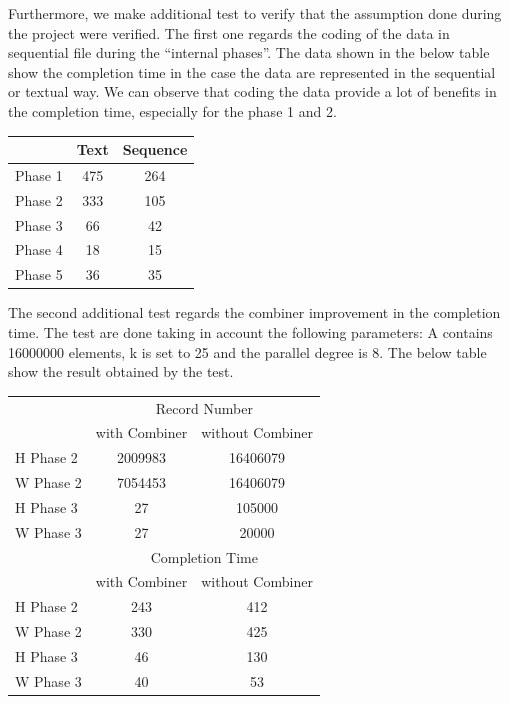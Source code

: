 Furthermore, we make additional test to verify that the assumption done during the project were verified. The first one regards the coding of the data in sequential file during the ``internal phases''. The data shown in the below table show the completion time in the case the data are represented in the sequential or textual way. We can observe that coding the data provide a lot of benefits in the completion time, especially for the phase 1 and 2.

\begin{center}
\begin{tabular}{ | l || c | c | }
  \hline      
  & Text & Sequence \\
  \hline      
  Phase 1 & 475 & 264 \\
  Phase 2 & 333 & 105 \\
  Phase 3 & 66 & 42 \\ 
  Phase 4 & 18 & 15 \\
  Phase 5 & 36 & 35 \\
  \hline  
\end{tabular}
\end{center}

The second additional test regards the combiner improvement in the completion time. The test are done taking in account the following parameters: A contains 16000000 elements, k is set to 25 and the parallel degree is 8. The below table show the result obtained by the test.

\begin{center}
\label{comb_table}
\begin{tabular}{ | l || c | c | }
  \hline      
  & \multicolumn{2}{|c|}{Record Number} \\
  & with Combiner & without Combiner \\
  \hline      
  H Phase 2 & 2009983 & 16406079 \\
  W Phase 2 & 7054453 & 16406079 \\ 
  H Phase 3 & 27 & 105000 \\ 
  W Phase 3 & 27 & 20000 \\ 
 \hline  
  \hline      
  & \multicolumn{2}{|c|}{Completion Time} \\
  & with Combiner & without Combiner \\
  \hline      
  H Phase 2 & 243 & 412 \\
  W Phase 2 & 330 & 425 \\ 
  H Phase 3 & 46 & 130 \\ 
  W Phase 3 & 40 & 53 \\ 
 \hline  
\end{tabular}

\end{center}














